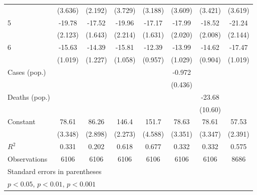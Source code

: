 \documentclass{article}
\begin{document}
{\begin{longtable}{l*{7}{c}}
                &  (3.636)         &  (2.192)         &  (3.729)         &  (3.188)         &  (3.609)         &  (3.421)         &  (3.619)         \\
5               &   -19.78\sym{***}&   -17.52\sym{***}&   -19.96\sym{***}&   -17.17\sym{***}&   -17.99\sym{***}&   -18.52\sym{***}&   -21.24\sym{***}\\
                &  (2.123)         &  (1.643)         &  (2.214)         &  (1.631)         &  (2.020)         &  (2.008)         &  (2.144)         \\
6               &   -15.63\sym{***}&   -14.39\sym{***}&   -15.81\sym{***}&   -12.39\sym{***}&   -13.99\sym{***}&   -14.62\sym{***}&   -17.47\sym{***}\\
                &  (1.019)         &  (1.227)         &  (1.058)         &  (0.957)         &  (1.029)         &  (0.904)         &  (1.019)         \\
Cases (pop.)    &                  &                  &                  &                  &   -0.972\sym{*}  &                  &                  \\
                &                  &                  &                  &                  &  (0.436)         &                  &                  \\
Deaths (pop.)   &                  &                  &                  &                  &                  &   -23.68\sym{*}  &                  \\
                &                  &                  &                  &                  &                  &  (10.60)         &                  \\
Constant        &    78.61\sym{***}&    86.26\sym{***}&    146.4\sym{***}&    151.7\sym{***}&    78.63\sym{***}&    78.61\sym{***}&    57.53\sym{***}\\
                &  (3.348)         &  (2.898)         &  (2.273)         &  (4.588)         &  (3.351)         &  (3.347)         &  (2.391)         \\
\hline
\(R^{2}\)       &    0.331         &    0.202         &    0.618         &    0.677         &    0.332         &    0.332         &    0.575         \\
Observations    &     6106         &     6106         &     6106         &     6106         &     6106         &     6106         &     8686         \\
\hline\hline
\multicolumn{8}{l}{\footnotesize Standard errors in parentheses}\\
\multicolumn{8}{l}{\footnotesize \sym{*} \(p<0.05\), \sym{**} \(p<0.01\), \sym{***} \(p<0.001\)}\\
\end{longtable}
}
\end{document}
